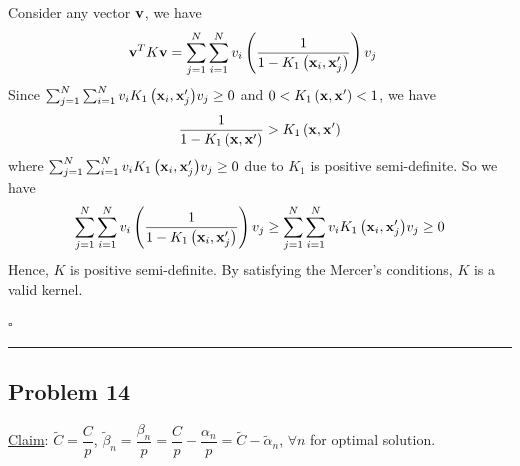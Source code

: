 \documentclass[12pt]{article}
\newcommand*{\QEDB}{\hfill\ensuremath{\square}}
\newcommand{\ParTh}[1]{\left(#1\right)}
\newcommand{\BF}[1]{{\bf#1}}
\newcommand{\horrule}[1]{\rule{\linewidth}{#1}}
\begin{document}
\begin{enumerate}
\begin{enumerate}
	Consider any vector $\BF{v}$, we have
	\begin{align}
	\BF{v}^TK\BF{v}&=\sum_{j=1}^{N}\sum_{i=1}^{N}v_i\ParTh{\dfrac{1}{1-K_1\ParTh{\BF{x}_i,\BF{x}^\prime_j}}}v_j
	\end{align}
	Since $\sum_{j=1}^{N}\sum_{i=1}^{N}v_i{K_1\ParTh{\BF{x}_i,\BF{x}^\prime_j}}v_j\geq0$ and $0<K_1\ParTh{\BF{x},\BF{x}^\prime}<1$, we have
	\begin{align}
	\dfrac{1}{1-K_1\ParTh{\BF{x},\BF{x}^\prime}}>K_1\ParTh{\BF{x},\BF{x}^\prime}
	\end{align}
	where $\sum_{j=1}^{N}\sum_{i=1}^{N}v_i{K_1\ParTh{\BF{x}_i,\BF{x}^\prime_j}}v_j\geq0$ due to $K_1$ is positive semi-definite. So we have
	\begin{align}
	\sum_{j=1}^{N}\sum_{i=1}^{N}v_i\ParTh{\dfrac{1}{1-K_1\ParTh{\BF{x}_i,\BF{x}^\prime_j}}}v_j\geq\sum_{j=1}^{N}\sum_{i=1}^{N}v_i{K_1\ParTh{\BF{x}_i,\BF{x}^\prime_j}}v_j\geq0
	\end{align}
	Hence, $K$ is positive semi-definite.
	By satisfying the Mercer's conditions, $K$ is a valid kernel.
\end{enumerate}
\end{enumerate}

\QEDB

\horrule{0.5pt}

\subsection*{Problem 14}

\underline{Claim}: $\tilde{C}=\dfrac{C}{p}$, $\tilde{\beta}_n=\dfrac{\beta_n}{p}=\dfrac{C}{p}-\dfrac{\alpha_n}{p}=\tilde{C}-\tilde{\alpha}_n$, $\forall n$ for optimal solution.
\end{document}
